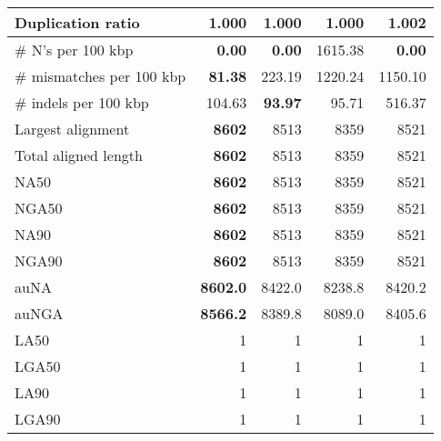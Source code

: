 \documentclass[12pt,a4paper]{article}
\begin{document}
\begin{table}[ht]
\begin{center}
\begin{tabular}{|l*{4}{|r}|}
Duplication ratio & {\bf 1.000} & {\bf 1.000} & {\bf 1.000} & 1.002 \\ \hline
\# N's per 100 kbp & {\bf 0.00} & {\bf 0.00} & 1615.38 & {\bf 0.00} \\ \hline
\# mismatches per 100 kbp & {\bf 81.38} & 223.19 & 1220.24 & 1150.10 \\ \hline
\# indels per 100 kbp & 104.63 & {\bf 93.97} & 95.71 & 516.37 \\ \hline
Largest alignment & {\bf 8602} & 8513 & 8359 & 8521 \\ \hline
Total aligned length & {\bf 8602} & 8513 & 8359 & 8521 \\ \hline
NA50 & {\bf 8602} & 8513 & 8359 & 8521 \\ \hline
NGA50 & {\bf 8602} & 8513 & 8359 & 8521 \\ \hline
NA90 & {\bf 8602} & 8513 & 8359 & 8521 \\ \hline
NGA90 & {\bf 8602} & 8513 & 8359 & 8521 \\ \hline
auNA & {\bf 8602.0} & 8422.0 & 8238.8 & 8420.2 \\ \hline
auNGA & {\bf 8566.2} & 8389.8 & 8089.0 & 8405.6 \\ \hline
LA50 & 1 & 1 & 1 & 1 \\ \hline
LGA50 & 1 & 1 & 1 & 1 \\ \hline
LA90 & 1 & 1 & 1 & 1 \\ \hline
LGA90 & 1 & 1 & 1 & 1 \\ \hline
\end{tabular}
\end{center}
\end{table}
\end{document}
